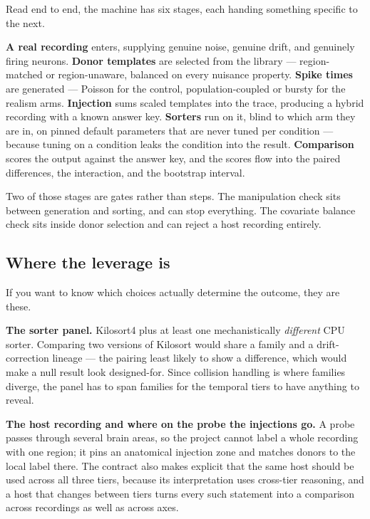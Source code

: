 \documentclass[12pt]{article}
\begin{document}
Read end to end, the machine has six stages, each handing something specific to the next.

\textbf{A real recording} enters, supplying genuine noise, genuine drift, and genuinely
firing neurons. \textbf{Donor templates} are selected from the library --- region-matched or
region-unaware, balanced on every nuisance property. \textbf{Spike times} are generated ---
Poisson for the control, population-coupled or bursty for the realism arms. \textbf{Injection}
sums scaled templates into the trace, producing a hybrid recording with a known answer key.
\textbf{Sorters} run on it, blind to which arm they are in, on pinned default parameters that
are never tuned per condition --- because tuning on a condition leaks the condition into the
result. \textbf{Comparison} scores the output against the answer key, and the scores flow into
the paired differences, the interaction, and the bootstrap interval.

Two of those stages are gates rather than steps. The manipulation check sits between generation
and sorting, and can stop everything. The covariate balance check sits inside donor selection
and can reject a host recording entirely.

\subsection{Where the leverage is}

If you want to know which choices actually determine the outcome, they are these.

\textbf{The sorter panel.} Kilosort4 plus at least one mechanistically \emph{different} CPU
sorter. Comparing two versions of Kilosort would share a family and a drift-correction lineage
--- the pairing least likely to show a difference, which would make a null result look
designed-for. Since collision handling is where families diverge, the panel has to span
families for the temporal tiers to have anything to reveal.

\textbf{The host recording and where on the probe the injections go.} A probe passes through
several brain areas, so the project cannot label a whole recording with one region; it pins an
anatomical injection zone and matches donors to the local label there. The contract also
makes explicit that the same host should be used across all three tiers, because its
interpretation uses cross-tier reasoning, and a host that changes between tiers turns every
such statement into a comparison across recordings as well as across axes.
\end{document}

